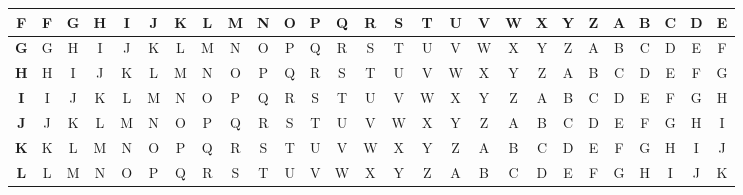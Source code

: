 \begin{table}[H]
{\begin{tabular}{c|c|c|c|c|c|c|c|c|c|c|c|c|c|c|c|c|c|c|c|c|c|c|c|c|c|c|}
            \hline
            \textbf{F} & F          & G          & H          & I          & J          & K          & L          & M          & N          & O          & P          & Q          & R          & S          & T          & U          & V          & W          & X          & Y          & Z          & A          & B          & C          & D          & E          \\[-1ex]
            \hline
            \textbf{G} & G          & H          & I          & J          & K          & L          & M          & N          & O          & P          & Q          & R          & S          & T          & U          & V          & W          & X          & Y          & Z          & A          & B          & C          & D          & E          & F          \\[-1ex]
            \hline
            \textbf{H} & H          & I          & J          & K          & L          & M          & N          & O          & P          & Q          & R          & S          & T          & U          & V          & W          & X          & Y          & Z          & A          & B          & C          & D          & E          & F          & G          \\[-1ex]
            \hline
            \textbf{I} & I          & J          & K          & L          & M          & N          & O          & P          & Q          & R          & S          & T          & U          & V          & W          & X          & Y          & Z          & A          & B          & C          & D          & E          & F          & G          & H          \\[-1ex]
            \hline
            \textbf{J} & J          & K          & L          & M          & N          & O          & P          & Q          & R          & S          & T          & U          & V          & W          & X          & Y          & Z          & A          & B          & C          & D          & E          & F          & G          & H          & I          \\[-1ex]
            \hline
            \textbf{K} & K          & L          & M          & N          & O          & P          & Q          & R          & S          & T          & U          & V          & W          & X          & Y          & Z          & A          & B          & C          & D          & E          & F          & G          & H          & I          & J          \\[-1ex]
            \hline
            \textbf{L} & L          & M          & N          & O          & P          & Q          & R          & S          & T          & U          & V          & W          & X          & Y          & Z          & A          & B          & C          & D          & E          & F          & G          & H          & I          & J          & K          \\[-1ex]

\end{tabular}}
\end{table}
